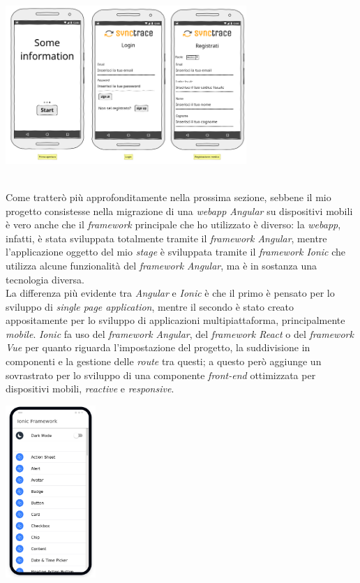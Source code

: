 \begin{minipage}{\linewidth}
  \centering
    \includegraphics[height=6cm]{immagini/appsketch}
\end{minipage} \\

Come tratterò più approfonditamente nella prossima sezione, sebbene il mio progetto consistesse nella migrazione di una \textit{webapp Angular} su dispositivi mobili è vero anche che il \textit{framework} principale che ho utilizzato è diverso: la \textit{webapp}, infatti, è stata sviluppata totalmente tramite il \textit{framework Angular}, mentre l'applicazione oggetto del mio \textit{stage} è sviluppata tramite il \textit{framework Ionic} che utilizza alcune funzionalità del \textit{framework Angular}, ma è in sostanza una tecnologia diversa. \\
La differenza più evidente tra \textit{Angular} e \textit{Ionic} è che il primo è pensato per lo sviluppo di \textit{single page application}, mentre il secondo è stato creato appositamente per lo sviluppo di applicazioni multipiattaforma, principalmente \textit{mobile}. \textit{Ionic} fa uso del \textit{framework Angular}, del \textit{framework React} o del \textit{framework Vue} per quanto riguarda l'impostazione del progetto, la suddivisione in componenti e la gestione delle \textit{route} tra questi; a questo però aggiunge un sovrastrato per lo sviluppo di una componente \textit{front-end} ottimizzata per dispositivi mobili, \textit{reactive} e \textit{responsive}. \\

\begin{minipage}{\linewidth}
  \centering
    \includegraphics[height=6.5cm]{immagini/ioniclib}
\end{minipage} \\

